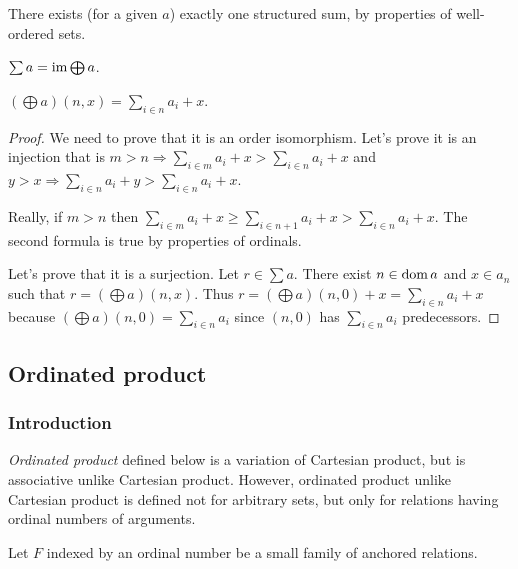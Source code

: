 There exists (for a given $a$) exactly one structured sum, by properties
of well-ordered sets.
\begin{obvious}
$\sum a=\operatorname{im}\bigoplus a$.\end{obvious}
\begin{thm}
$\left(\bigoplus a\right)(n,x)=\sum_{i\in n}a_{i}+x$.\end{thm}
\begin{proof}
We need to prove that it is an order isomorphism. Let's prove it is
an injection that is $m>n\Rightarrow\sum_{i\in m}a_{i}+x>\sum_{i\in n}a_{i}+x$
and $y>x\Rightarrow\sum_{i\in n}a_{i}+y>\sum_{i\in n}a_{i}+x$.

Really, if $m>n$ then $\sum_{i\in m}a_{i}+x\geq\sum_{i\in n+1}a_{i}+x>\sum_{i\in n}a_{i}+x$.
The second formula is true by properties of ordinals.

Let's prove that it is a surjection. Let $r\in\sum a$. There exist
$n\in\operatorname{dom} a$ and $x\in a_{n}$ such that $r=\left(\bigoplus a\right)(n,x)$.
Thus $r=\left(\bigoplus a\right)(n,0)+x=\sum_{i\in n}a_{i}+x$ because
$\left(\bigoplus a\right)(n,0)=\sum_{i\in n}a_{i}$ since $(n,0)$
has $\sum_{i\in n}a_{i}$ predecessors.
\end{proof}

\subsection{\label{ordinated-prod}Ordinated product}


\subsubsection{Introduction}

\emph{Ordinated product} defined below is a variation of Cartesian
product, but is associative unlike Cartesian product. However, ordinated
product unlike Cartesian product is defined not for arbitrary sets,
but only for relations having ordinal numbers of arguments.

Let $F$ indexed by an ordinal number be a small family of anchored
relations.


